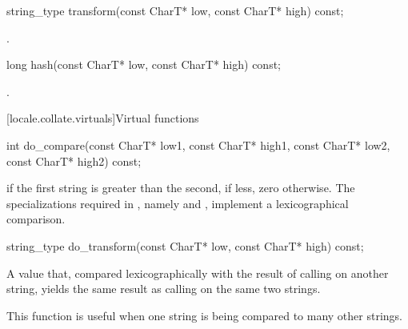 %
\begin{itemdecl}
string_type transform(const CharT* low, const CharT* high) const;
\end{itemdecl}

\begin{itemdescr}
\pnum
\returns
{}.
\end{itemdescr}

%
\begin{itemdecl}
long hash(const CharT* low, const CharT* high) const;
\end{itemdecl}

\begin{itemdescr}
\pnum
\returns
{}.
\end{itemdescr}

[locale.collate.virtuals]{Virtual functions}

%
\begin{itemdecl}
int do_compare(const CharT* low1, const CharT* high1,
               const CharT* low2, const CharT* high2) const;
\end{itemdecl}

\begin{itemdescr}
\pnum
\returns
{} if the first string is greater than the second,
 if less,
zero otherwise.
The specializations
required in ,
namely  and ,
implement a lexicographical comparison.
\end{itemdescr}

%
\begin{itemdecl}
string_type do_transform(const CharT* low, const CharT* high) const;
\end{itemdecl}

\begin{itemdescr}
\pnum
\returns
A  value that,
compared lexicographically with
the result of calling  on another string,
yields the same result as calling  on the same two strings.
\begin{footnote}
This function is useful when one string is being compared to many other strings.
\end{footnote}
\end{itemdescr}

